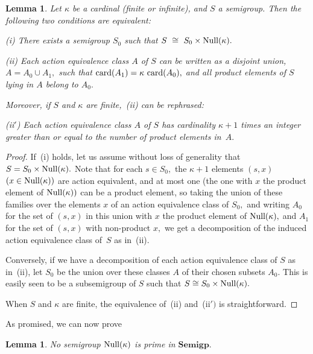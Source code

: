 \documentclass{amsart}
\newtheorem{lemma}[theorem]{Lemma}
\numberwithin{equation}{section}
\numberwithin{theorem}{section}
\begin{document}
\begin{lemma}\label{L.null-kappa_x}
Let $\kappa$ be a cardinal \textup{(}finite or
infinite\textup{)}, and $S$ a semigroup.
Then the following two conditions are equivalent:

{\rm(i)} There exists a semigroup $S_0$ such that
$S~\cong~S_0\times\textup{Null}(\kappa).$

{\rm(ii)} Each action equivalence class $A$ of $S$ can
be written as a disjoint union, $A=A_0\cup A_1,$ such that
$\textup{card}(A_1)=\kappa~\textup{card}(A_0),$ and
all {\em product} elements of $S$ lying in $A$ belong to $A_0.$

Moreover, if $S$ and $\kappa$ are finite,~{\rm(ii)} can be rephrased:

{\rm(ii$\!'\!$)} Each action equivalence class $A$ of $S$ has
cardinality $\kappa\!+\!1$ times an integer greater than or equal
to the number of product elements in~$A.$
\end{lemma}

\begin{proof}
If~(i) holds, let us assume without loss of generality
that $S=S_0\times\textup{Null}(\kappa).$
Note that for each $s\in S_0,$ the $\kappa\!+\!1$
elements $(s,x)$ $(x\in\textup{Null}(\kappa))$ are
action equivalent, and at most one (the one with $x$
the product element of $\textup{Null}(\kappa))$
can be a product element, so taking the union of these families
over the elements $x$ of an action equivalence class of $S_0,$
and writing $A_0$ for the set of $(s,x)$ in this union with $x$ the
product element of $\textup{Null}(\kappa),$ and $A_1$
for the set of $(s,x)$ with non-product $x,$
we get a decomposition of the induced action equivalence
class of~$S$ as in~(ii).

Conversely, if we have a decomposition of each action equivalence
class of $S$ as in~(ii), let $S_0$ be the union
over these classes $A$ of their chosen subsets $A_0.$
This is easily seen to be a subsemigroup of $S$ such that
$S\cong S_0\times\textup{Null}(\kappa).$

When $S$ and $\kappa$ are finite,
the equivalence of~(ii) and~(ii$\!')$ is straightforward.
\end{proof}

As promised, we can now prove

\begin{lemma}\label{L.null_not_prime}
No semigroup $\textup{Null}(\kappa)$ is prime in $\mathbf{Semigp}.$
\end{lemma}
\end{document}
